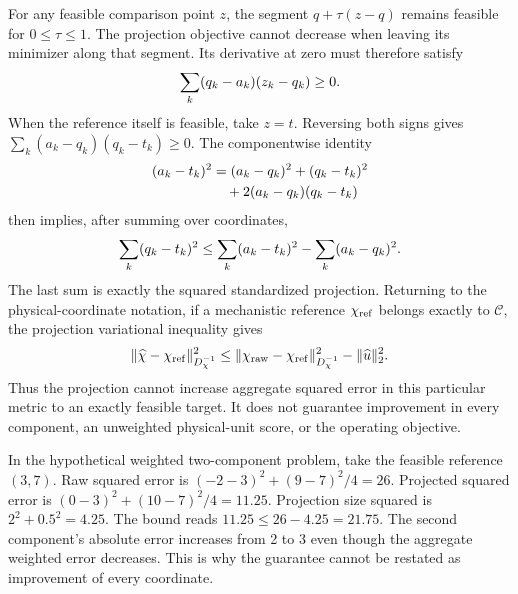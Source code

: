 For any feasible comparison point $z$, the segment $q+\tau(z-q)$ remains feasible for $0\le\tau\le1$. The projection objective cannot decrease when leaving its minimizer along that segment. Its derivative at zero must therefore satisfy
\begin{equation}
\equationname{Variational inequality characterizing a Euclidean projection}
\sum_k(q_k-a_k)(z_k-q_k)\ge0.
\end{equation}
When the reference itself is feasible, take $z=t$. Reversing both signs gives $\sum_k(a_k-q_k)(q_k-t_k)\ge0$. The componentwise identity
\begin{align}
\equationname{Coordinatewise squared-error decomposition}
(a_k-t_k)^2&=(a_k-q_k)^2+(q_k-t_k)^2\\
\equationname{Cross term in the coordinatewise squared-error decomposition}
&\quad+2(a_k-q_k)(q_k-t_k)
\end{align}
then implies, after summing over coordinates,
\begin{equation}
\equationname{Squared-error bound for a feasible reference}
\sum_k(q_k-t_k)^2\le\sum_k(a_k-t_k)^2-\sum_k(a_k-q_k)^2.
\end{equation}
The last sum is exactly the squared standardized projection. Returning to the physical-coordinate notation, if a mechanistic reference $\chi_{\rm ref}$ belongs exactly to $\mathcal C$, the projection variational inequality gives
\begin{equation}
\equationname{Weighted error reduction bound when the reference is projection-feasible}
\|\widehat\chi-\chi_{\rm ref}\|_{D_\chi^{-1}}^2
\le\|\chi_{\rm raw}-\chi_{\rm ref}\|_{D_\chi^{-1}}^2
-\|\widehat u\|_2^2.
\label{eq:plant_projection_error_exact}
\end{equation}
Thus the projection cannot increase aggregate squared error in this particular metric to an exactly feasible target. It does not guarantee improvement in every component, an unweighted physical-unit score, or the operating objective.

In the hypothetical weighted two-component problem, take the feasible reference $(3,7)$. Raw squared error is $(-2-3)^2+(9-7)^2/4=26$. Projected squared error is $(0-3)^2+(10-7)^2/4=11.25$. Projection size squared is $2^2+0.5^2=4.25$. The bound reads $11.25\le26-4.25=21.75$. The second component's absolute error increases from 2 to 3 even though the aggregate weighted error decreases. This is why the guarantee cannot be restated as improvement of every coordinate.

